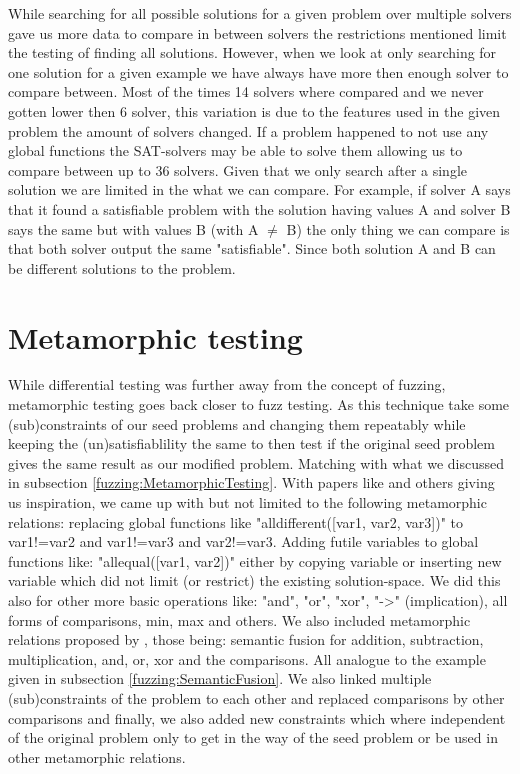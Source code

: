 While searching for all possible solutions for a given problem over multiple solvers gave us more data to compare in between solvers the restrictions mentioned limit the testing of finding all solutions. However, when we look at only searching for one solution for a given example we have always have more then enough solver to compare between. Most of the times 14 solvers where compared and we never gotten lower then 6 solver, this variation is due to the features used in the given problem the amount of solvers changed. If a problem happened to not use any global functions the SAT-solvers may be able to solve them allowing us to compare between up to 36 solvers. Given that we only search after a single solution we are limited in the what we can compare. For example, if solver A says that it found a satisfiable problem with the solution having values A and solver B says the same but with values B (with A $\neq$ B) the only thing we can compare is that both solver output the same "satisfiable". Since both solution A and B can be different solutions to the problem.

\section{Metamorphic testing}
While differential testing was further away from the concept of fuzzing, metamorphic testing goes back closer to fuzz testing. As this technique take some (sub)constraints of our seed problems and changing them repeatably while keeping the (un)satisfiablility the same to then test if the original seed problem gives the same result as our modified problem. Matching with what we discussed in subsection \ref{fuzzing:MetamorphicTesting}. With papers like \cite{50akgun2018metamorphic, 49usman2020testmc, 43YinYang} and others giving us inspiration, we came up with but not limited to the following metamorphic relations: replacing global functions like "alldifferent([var1, var2, var3])" to var1!=var2 and var1!=var3 and var2!=var3. Adding futile variables to global functions like: "allequal([var1, var2])" either by copying variable or inserting new variable which did not limit (or restrict) the existing solution-space. We did this also for other more basic operations like: "and", "or", "xor", "->" (implication), all forms of comparisons, min, max and others. We also included metamorphic relations proposed by \cite{43YinYang}, those being: semantic fusion for addition, subtraction, multiplication, and, or, xor and the comparisons. All analogue to the example given in subsection \ref{fuzzing:SemanticFusion}. We also linked multiple (sub)constraints of the problem to each other and replaced comparisons by other comparisons and finally, we also added new constraints which where independent of the original problem only to get in the way of the seed problem or be used in other metamorphic relations.

